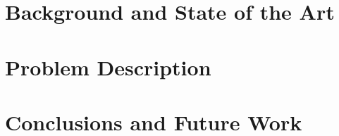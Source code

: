 \documentclass[runningheads,a4paper]{llncs}
\begin{document}
\section{Background and State of the Art}
\label{sec:soa}





\section{Problem Description}
\label{sec:torcs}



%
\section{Conclusions and Future Work} 
\label{sec:conclusions}



\end{document}
